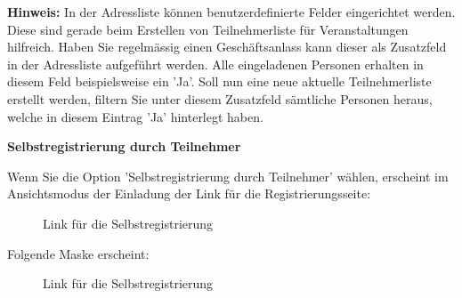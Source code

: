\textbf{Hinweis:} In der Adressliste können benutzerdefinierte Felder eingerichtet werden. Diese sind gerade beim Erstellen von Teilnehmerliste für Veranstaltungen hilfreich. Haben Sie regelmässig einen Geschäftsanlass kann dieser als Zusatzfeld in der Adressliste aufgeführt werden. Alle eingeladenen Personen erhalten in diesem Feld beispielsweise ein 'Ja'. Soll nun eine neue aktuelle Teilnehmerliste erstellt werden, filtern Sie unter diesem Zusatzfeld sämtliche Personen heraus, welche in diesem Eintrag 'Ja' hinterlegt haben.

\vspace{\baselineskip}

\textbf{Selbstregistrierung durch Teilnehmer}
\label{bkm:Ref2018072302}

Wenn Sie die Option 'Selbstregistrierung durch Teilnehmer' wählen, erscheint im Ansichtsmodus der Einladung der Link für die Registrierungsseite:

\begin{figure}[H]
\caption{Link für die Selbstregistrierung}
\end{figure}

Folgende Maske erscheint:

\begin{figure}[H]
\caption{Link für die Selbstregistrierung}
\end{figure}

